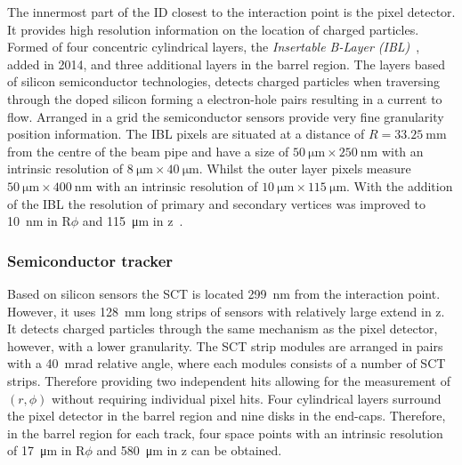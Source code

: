 The innermost part of the ID closest to the interaction point is the pixel detector. It provides high resolution information on the location of charged particles. Formed of four concentric cylindrical layers, the \emph{Insertable B-Layer (IBL)}~\cite{ATLAS:IBL-TDR}, added in 2014, and three additional layers in the barrel region. The layers based of silicon semiconductor technologies, detects charged particles when traversing through the doped silicon forming a electron-hole pairs resulting in a current to flow. Arranged in a grid the semiconductor sensors provide very fine granularity position information. The IBL pixels are situated at a distance of $R = \SI{33.25}{\milli\meter}$ from the centre of the beam pipe and have a size of $\SI{50}{\micro\meter} \times \SI{250}{\nano\meter}$ with an intrinsic resolution of $\SI{8}{\micro\meter} \times \SI{40}{\micro\meter}$. Whilst the outer layer pixels measure $\SI{50}{\micro\meter} \times \SI{400}{\nano\meter}$ with an intrinsic resolution of $\SI{10}{\micro\meter} \times \SI{115}{\micro\meter}$. With the addition of the IBL the resolution of primary and secondary vertices was improved to \SI{10}{\nano\meter} in R$\phi$ and \SI{115}{\micro\meter} in z~\cite{Rosa}. 

\subsubsection{Semiconductor tracker}
Based on silicon sensors the SCT is located \SI{299}{\nano\meter} from the interaction point. However, it uses \SI{128}{\milli\meter} long strips of sensors with relatively large extend in z. It detects charged particles through the same mechanism as the pixel detector, however, with a lower granularity. The SCT strip modules are arranged in pairs with a \SI{40}{\milli\radian} relative angle, where each modules consists of a number of SCT strips. Therefore providing two independent hits allowing for the measurement of $(r,\phi)$ without requiring individual pixel hits. Four cylindrical layers surround the pixel detector in the barrel region and nine disks in the end-caps. Therefore, in the barrel region for each track, four space points with an intrinsic resolution of \SI{17}{\micro\meter} in R$\phi$ and \SI{580}{\micro\meter} in z can be obtained.

